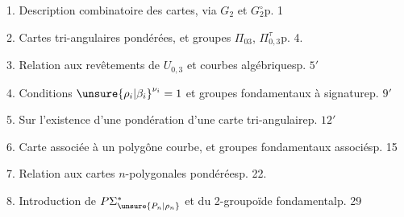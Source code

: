 1. Description combinatoire des cartes, via $G_2$ et $G_2^\circ$\hfill p. 1

2. Cartes tri-angulaires pondérées, et groupes $\Pi_{03}$, $\Pi_{0,3}^\tau$\hfill p. 4.

3. Relation aux revêtements de $U_{0,3}$ et courbes algébriques\hfill p. $5'$

4. Conditions $\unsure{\rho_i|\beta_i}^{\nu_i}=1$ et groupes fondamentaux à signature\hfill p. $9'$

5. Sur l'existence d'une pondération d'une carte tri-angulaire\hfill p. $12'$

6. Carte associée à un polygône courbe, et groupes fondamentaux associés\hfill p. 15

7. Relation aux cartes $n$-polygonales pondérées\hfill p. 22.

8. Introduction de $P\Sigma^*_{\unsure{P_n|\rho_n}}$ et du 2-groupoïde fondamental\hfill p. 29

